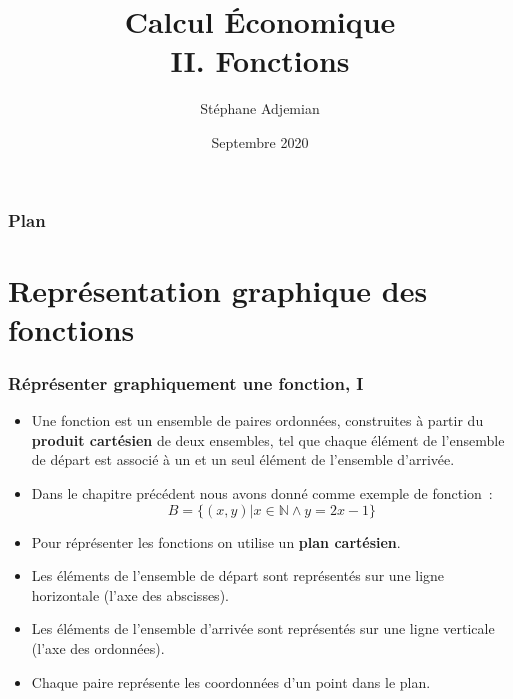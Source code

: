 \documentclass[10pt,notheorems]{beamer}
\theoremstyle{plain}
\theoremstyle{definition} %
\begin{document}
\title{Calcul Économique\\\small{II. Fonctions}}
\author[S. Adjemian]{Stéphane Adjemian}
 \date{Septembre 2020}

\begin{frame}
  \titlepage{}
\end{frame}

\begin{frame}
  \frametitle{Plan}
  \tableofcontents
\end{frame}


\section{Représentation graphique des fonctions}

\begin{frame}
  \frametitle{Réprésenter graphiquement une fonction, I}
  \hypertarget{slide_plan_cartesien_1}{}

  \begin{itemize}

  \item Une fonction est un ensemble de paires ordonnées, construites
    à partir du \textbf{produit cartésien} de deux ensembles, tel que chaque
    élément de l'ensemble de départ est associé à un et un seul
    élément de l'ensemble d'arrivée.\newline

  \item Dans le chapitre précédent nous avons donné comme exemple de fonction~:
    \[
      B = \{(x,y) | x\in\mathbb N \land y = 2x-1\}
    \]

  \item Pour réprésenter les fonctions on utilise un \textbf{plan cartésien}.\newline

  \item Les éléments de l'ensemble de départ sont représentés sur une ligne horizontale (l'axe des abscisses).\newline

  \item Les éléments de l'ensemble d'arrivée sont représentés sur une ligne verticale (l'axe des ordonnées).\newline

  \item Chaque paire représente les coordonnées d'un point dans le plan.

  \end{itemize}

\end{frame}
\end{document}
